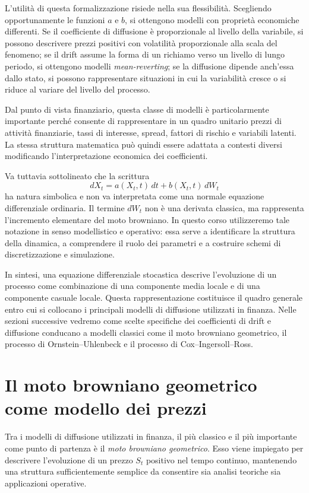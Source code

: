 L'utilit\`a di questa formalizzazione risiede nella sua flessibilit\`a.
Scegliendo opportunamente le funzioni $a$ e $b$, si ottengono modelli con
propriet\`a economiche differenti. Se il coefficiente di diffusione \`e
proporzionale al livello della variabile, si possono descrivere prezzi
positivi con volatilit\`a  proporzionale alla scala del fenomeno; se il
drift assume la forma di un richiamo verso un livello di lungo periodo,
si ottengono modelli \emph{mean-reverting}; se la diffusione dipende
anch'essa dallo stato, si possono rappresentare situazioni in cui la
variabilit\`a cresce o si riduce al variare del livello del processo.

Dal punto di vista finanziario, questa classe di modelli \`e
particolarmente importante perch\'e consente di rappresentare in un quadro
unitario prezzi di attivit\`a finanziarie, tassi di interesse, spread,
fattori di rischio e variabili latenti. La stessa struttura matematica
pu\`o quindi essere adattata a contesti diversi modificando
l'interpretazione economica dei coefficienti.

Va tuttavia sottolineato che la scrittura
\[
dX_t = a(X_t,t)\,dt + b(X_t,t)\,dW_t
\]
ha natura simbolica e non va interpretata come una normale equazione
differenziale ordinaria. Il termine $dW_t$ non \`e una derivata classica,
ma rappresenta l'incremento elementare del moto browniano. In questo
corso utilizzeremo tale notazione in senso modellistico e operativo:
essa serve a identificare la struttura della dinamica, a comprendere il
ruolo dei parametri e a costruire schemi di discretizzazione e
simulazione.

In sintesi, una equazione differenziale stocastica descrive l'evoluzione
di un processo come combinazione di una componente media locale e di una
componente casuale locale. Questa rappresentazione costituisce il quadro
generale entro cui si collocano i principali modelli di diffusione
utilizzati in finanza. Nelle sezioni successive vedremo come scelte
specifiche dei coefficienti di drift e diffusione conducano a modelli
classici come il moto browniano geometrico, il processo di
Ornstein--Uhlenbeck e il processo di Cox--Ingersoll--Ross.
\section{Il moto browniano geometrico come modello dei prezzi}

Tra i modelli di diffusione utilizzati in finanza, il pi\`u classico e il
pi\`u importante come punto di partenza \`e il \emph{moto browniano
geometrico}. Esso viene impiegato per descrivere l'evoluzione di un
prezzo $S_t$ positivo nel tempo continuo, mantenendo una struttura
sufficientemente semplice da consentire sia analisi teoriche sia
applicazioni operative.

